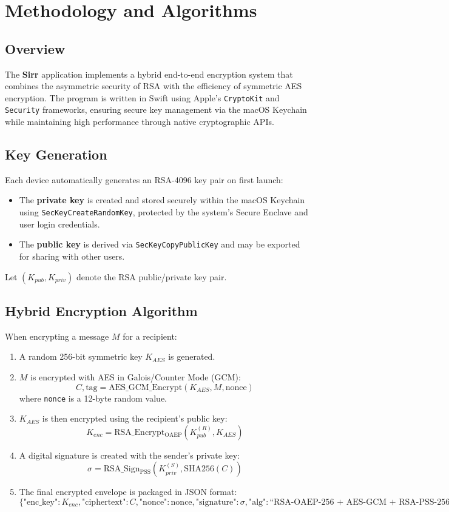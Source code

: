 \section{Methodology and Algorithms}

\subsection{Overview}
The \textbf{Sirr} application implements a hybrid end-to-end encryption system that combines the asymmetric security of RSA with the efficiency of symmetric AES encryption. 
The program is written in Swift using Apple's \texttt{CryptoKit} and \texttt{Security} frameworks, ensuring secure key management via the macOS Keychain while maintaining high performance through native cryptographic APIs.

\subsection{Key Generation}
Each device automatically generates an RSA-4096 key pair on first launch:
\begin{itemize}
  \item The \textbf{private key} is created and stored securely within the macOS Keychain using \texttt{SecKeyCreateRandomKey}, protected by the system’s Secure Enclave and user login credentials.
  \item The \textbf{public key} is derived via \texttt{SecKeyCopyPublicKey} and may be exported for sharing with other users.
\end{itemize}

Let $(K_{pub}, K_{priv})$ denote the RSA public/private key pair.

\subsection{Hybrid Encryption Algorithm}
When encrypting a message $M$ for a recipient:
\begin{enumerate}
  \item A random 256-bit symmetric key $K_{AES}$ is generated.
  \item $M$ is encrypted with AES in Galois/Counter Mode (GCM):
  \[
  C, \text{tag} = \mathrm{AES\_GCM\_Encrypt}(K_{AES}, M, \text{nonce})
  \]
  where \texttt{nonce} is a 12-byte random value.
  \item $K_{AES}$ is then encrypted using the recipient’s public key:
  \[
  K_{enc} = \mathrm{RSA\_Encrypt_{OAEP}}(K_{pub}^{(R)}, K_{AES})
  \]
  \item A digital signature is created with the sender’s private key:
  \[
  \sigma = \mathrm{RSA\_Sign_{PSS}}(K_{priv}^{(S)}, \mathrm{SHA256}(C))
  \]
  \item The final encrypted envelope is packaged in JSON format:
  \[
  \{
    \text{"enc\_key"}: K_{enc},
    \text{"ciphertext"}: C,
    \text{"nonce"}: \text{nonce},
    \text{"signature"}: \sigma,
    \text{"alg"}: \text{``RSA-OAEP-256 + AES-GCM + RSA-PSS-256''}
  \}
  \]
\end{enumerate}

